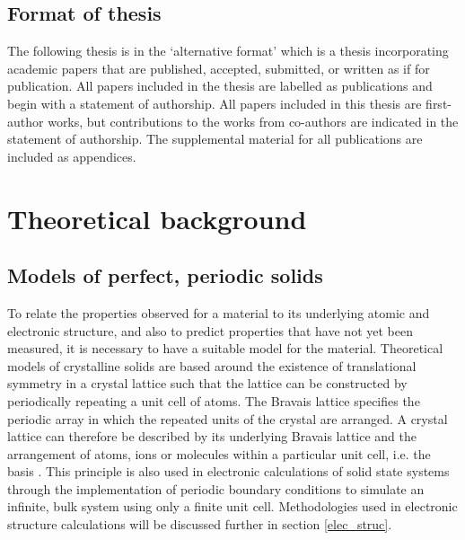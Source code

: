 \documentclass[11pt, twoside]{report}
\begin{document}
\section{Format of thesis}
The following thesis is in the `alternative format' which is a thesis incorporating academic papers that are published, accepted, submitted, or written as if for publication. All papers included in the thesis are labelled as publications and begin with a statement of authorship. All papers included in this thesis are first-author works, but contributions to the works from co-authors are indicated in the statement of authorship. The supplemental material for all publications are included as appendices.



\chapter{Theoretical background} 

\section{Models of perfect, periodic solids}\label{crystal_models}
To relate the properties observed for a material to its underlying atomic and electronic structure, and also to predict properties that have not yet been measured, it is necessary to have a suitable model for the material. Theoretical models of crystalline solids are based around the existence of translational symmetry in a crystal lattice such that the lattice can be constructed by periodically repeating a unit cell of atoms. The Bravais lattice specifies the periodic array in which the repeated units of the crystal are arranged. A crystal lattice can therefore be described by its underlying Bravais lattice and the arrangement of atoms, ions or molecules within a particular unit cell, i.e. the basis \cite{AshcroftMermin2}. This principle is also used in electronic calculations of solid state systems through the implementation of periodic boundary conditions to simulate an infinite, bulk system using only a finite unit cell. Methodologies used in electronic structure calculations will be discussed further in section \ref{elec_struc}.
 
\end{document}
